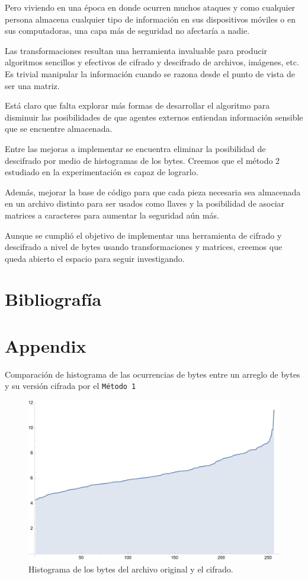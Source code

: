 \documentclass[a4paper]{article}
\begin{document}
Pero viviendo en una época en donde ocurren muchos ataques y como cualquier
persona almacena cualquier tipo de información en sus dispositivos móviles o en
sus computadoras, una capa más de seguridad no afectaría a nadie.

Las transformaciones resultan una herramienta invaluable para producir
algoritmos sencillos y efectivos de cifrado y descifrado de archivos, imágenes,
etc. Es trivial manipular la información cuando se razona desde el punto de
vista de ser una matriz.

Está claro que falta explorar más formas de desarrollar el algoritmo para
disminuir las posibilidades de que agentes externos entiendan información
sensible que se encuentre almacenada.

Entre las mejoras a implementar se encuentra eliminar la posibilidad de
descifrado por medio de histogramas de los bytes. Creemos que el método 2
estudiado en la experimentación es capaz de lograrlo.

Además, mejorar la base de código para que cada pieza necesaria sea almacenada
en un archivo distinto para ser usados como llaves y la posibilidad de asociar
matrices a caracteres para aumentar la seguridad aún más.

Aunque se cumplió el objetivo de implementar una herramienta de cifrado y
descifrado
a
nivel de bytes usando transformaciones y matrices, creemos que queda abierto el
espacio para seguir investigando.

\newpage
\section{Bibliografía}
\printbibliography[heading=none]

\newpage

\appendix

\section{Appendix}

Comparación de histograma de las ocurrencias de bytes entre un arreglo de bytes
y su versión cifrada por el \texttt{Método 1}

\begin{figure}[H]
    \centering
    \includegraphics[scale=0.7]{historygramorig}
    \caption*{Histograma de los bytes del archivo
original y el cifrado.}\label{fig:d1}
\end{figure}
\end{document}
